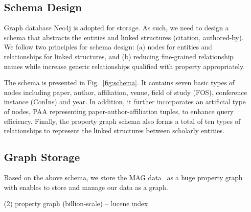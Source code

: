 \subsection{Schema Design} \label{subsec:schema}

Graph database Neo4j is adopted for storage. As such, we need to design a schema that abstracts the entities and linked structures (\eg citation, authored-by).
We follow two principles for schema design: (a) nodes for entities and relationships for linked structures, and (b) reducing fine-grained relationship names while increase generic relationships qualified with property appropriately.

The schema is presented in Fig.~\ref{fig:schema}. 
It contains seven basic types of nodes including paper, author, affiliation, venue, field of study (FOS), conference instance (ConIns) and year. In addition, it further incorporates an artificial type of nodes, \ie PAA representing paper-author-affiliation tuples, to enhance query efficiency. 
Finally, the property graph schema also forms a total of ten types of relationships to represent the linked structures between scholarly entities.



\subsection{Graph Storage} \label{subsec:storage}




Based on the above schema, we store the MAG data~\cite{sinha2015overview} as a huge property graph with  
enables to store and manage our data as a graph.






(2) property graph (billion-scale) -- lucene index

